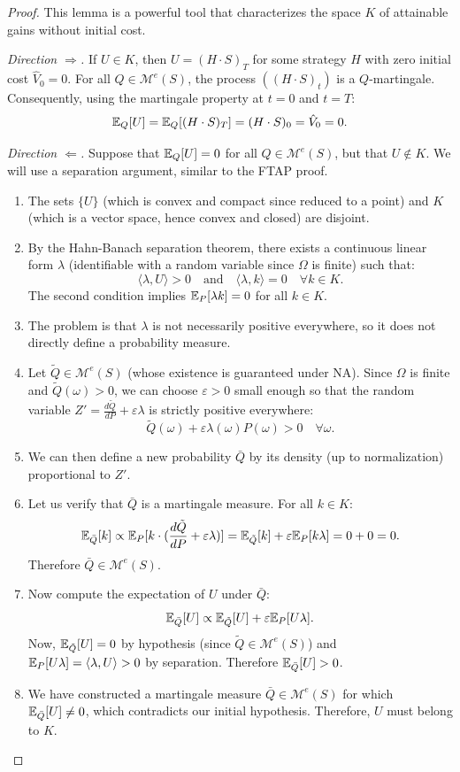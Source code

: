 \begin{proof}
This lemma is a powerful tool that characterizes the space $K$ of attainable gains without initial cost.

\emph{Direction $\Rightarrow$.} If $U\in K$, then $U = (H\cdot S)_T$ for some strategy $H$ with zero initial cost $\hat{V}_0=0$. For all $Q\in\mathcal{M}^e(S)$, the process $((H\cdot S)_t)$ is a $Q$-martingale. Consequently, using the martingale property at $t=0$ and $t=T$:
\[
\mathbb{E}_Q[U] = \mathbb{E}_Q[(H\cdot S)_T] = (H\cdot S)_0 = \hat{V}_0 = 0.
\]

\emph{Direction $\Leftarrow$.} Suppose that $\mathbb{E}_Q[U] = 0$ for all $Q \in \mathcal{M}^e(S)$, but that $U \notin K$.
We will use a separation argument, similar to the FTAP proof.
\begin{enumerate}
    \item The sets $\{U\}$ (which is convex and compact since reduced to a point) and $K$ (which is a vector space, hence convex and closed) are disjoint.
    \item By the Hahn-Banach separation theorem, there exists a continuous linear form $\lambda$ (identifiable with a random variable since $\Omega$ is finite) such that:
    \[
    \langle \lambda, U \rangle > 0 \quad \text{and} \quad \langle \lambda, k \rangle = 0 \quad \forall k \in K.
    \]
    The second condition implies $\mathbb{E}_P[\lambda k] = 0$ for all $k \in K$.
    \item The problem is that $\lambda$ is not necessarily positive everywhere, so it does not directly define a probability measure.
    \item Let $\tilde{Q} \in \mathcal{M}^e(S)$ (whose existence is guaranteed under NA). Since $\Omega$ is finite and $\tilde{Q}(\omega)>0$, we can choose $\varepsilon > 0$ small enough so that the random variable $Z' = \frac{d\tilde{Q}}{dP} + \varepsilon \lambda$ is strictly positive everywhere:
    \[
    \tilde{Q}(\omega) + \varepsilon \lambda(\omega) P(\omega) > 0 \quad \forall \omega.
    \]
    \item We can then define a new probability $\bar{Q}$ by its density (up to normalization) proportional to $Z'$.
    \item Let us verify that $\bar{Q}$ is a martingale measure. For all $k \in K$:
    \[
    \mathbb{E}_{\bar{Q}}[k] \propto \mathbb{E}_P[k \cdot (\frac{d\tilde{Q}}{dP} + \varepsilon \lambda)] = \mathbb{E}_{\tilde{Q}}[k] + \varepsilon \mathbb{E}_P[k \lambda] = 0 + 0 = 0.
    \]
    Therefore $\bar{Q} \in \mathcal{M}^e(S)$.
    \item Now compute the expectation of $U$ under $\bar{Q}$:
    \[
    \mathbb{E}_{\bar{Q}}[U] \propto \mathbb{E}_{\tilde{Q}}[U] + \varepsilon \mathbb{E}_P[U \lambda].
    \]
    Now, $\mathbb{E}_{\tilde{Q}}[U]=0$ by hypothesis (since $\tilde{Q} \in \mathcal{M}^e(S)$) and $\mathbb{E}_P[U \lambda] = \langle \lambda, U \rangle > 0$ by separation.
    Therefore $\mathbb{E}_{\bar{Q}}[U] > 0$.
    \item We have constructed a martingale measure $\bar{Q} \in \mathcal{M}^e(S)$ for which $\mathbb{E}_{\bar{Q}}[U] \neq 0$, which contradicts our initial hypothesis. Therefore, $U$ must belong to $K$.
\end{enumerate}
\end{proof}


